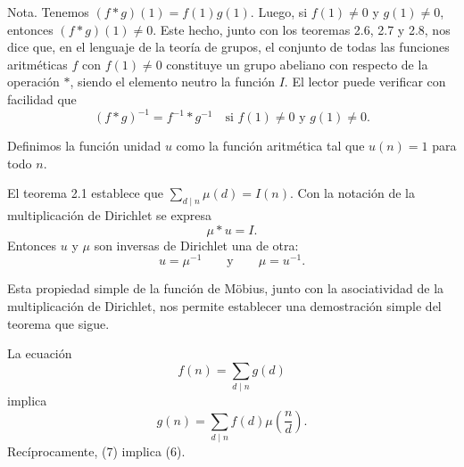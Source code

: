 \documentclass[12pt,a4paper]{book}
\begin{document}
    Nota. Tenemos $(f*g)(1)=f(1)g(1)$. Luego, si $f(1)\neq0$ y $g(1)\neq0$, entonces
    $(f*g)(1)\neq0$. Este hecho, junto con los teoremas 2.6, 2.7 y 2.8, nos dice que, en el
    lenguaje de la teoría de grupos, el conjunto de todas las funciones aritméticas $f$ con
    $f(1)\neq0$ constituye un grupo abeliano con respecto de la operación $*$, siendo el
    elemento neutro la función $I$. El lector puede verificar con facilidad que
    \begin{equation*}
        (f*g)^{-1}=f^{-1}*g^{-1}\quad\text{si } f(1)\neq0 \text{ y } g(1)\neq0.
    \end{equation*}

    \begin{definicion}
        Definimos la función unidad $u$ como la función aritmética tal que $u(n)=1$ para\label{sim:u}
        todo $n$.
    \end{definicion}

    El teorema 2.1 establece que $\sum_{d\mid n}\mu(d)=I(n)$. Con la notación de la
    multiplicación de Dirichlet se expresa
    \begin{equation*}
        \mu*u=I.
    \end{equation*}
    Entonces $u$ y $\mu$ son inversas de Dirichlet una de otra:
    \begin{equation*}
        u=\mu^{-1}\qquad\text{y}\qquad \mu=u^{-1}.
    \end{equation*}

    Esta propiedad simple de la función de Möbius, junto con la asociatividad de la
    multiplicación de Dirichlet, nos permite establecer una demostración simple del teorema
    que sigue.

    \begin{teorema}
        La ecuación
        \begin{equation}
            f(n)=\sum_{d\mid n}g(d)
        \end{equation}
        implica
        \begin{equation}
            g(n)=\sum_{d\mid n}f(d)\mu\left(\frac{n}{d}\right).
        \end{equation}
        Recíprocamente, (7) implica (6).
    \end{teorema}
\end{document}
